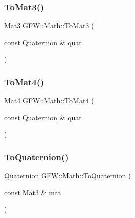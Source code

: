 \subsubsection{\texorpdfstring{To\+Mat3()}{ToMat3()}}
{\footnotesize\ttfamily \hyperlink{namespace_g_f_w_1_1_math_ab5dfc77d541d85c8e2a42f6e645fba70}{Mat3} G\+F\+W\+::\+Math\+::\+To\+Mat3 (\begin{DoxyParamCaption}\item[{const \hyperlink{namespace_g_f_w_1_1_math_ae0c2a9f7efcd94286b950a2ddea66ee0}{Quaternion} \&}]{quat }\end{DoxyParamCaption})\hspace{0.3cm}{\ttfamily [inline]}}

\mbox{\label{namespace_g_f_w_1_1_math_a96067ac21170d0dc012478d488f90b40}} 
\subsubsection{\texorpdfstring{To\+Mat4()}{ToMat4()}}
{\footnotesize\ttfamily \hyperlink{namespace_g_f_w_1_1_math_a313d630ab7d0ef3b109bb39401962fb1}{Mat4} G\+F\+W\+::\+Math\+::\+To\+Mat4 (\begin{DoxyParamCaption}\item[{const \hyperlink{namespace_g_f_w_1_1_math_ae0c2a9f7efcd94286b950a2ddea66ee0}{Quaternion} \&}]{quat }\end{DoxyParamCaption})\hspace{0.3cm}{\ttfamily [inline]}}

\mbox{\label{namespace_g_f_w_1_1_math_a687d2ab6e9ec6a46e494f038adadafac}} 
\subsubsection{\texorpdfstring{To\+Quaternion()}{ToQuaternion()}\hspace{0.1cm}{\footnotesize\ttfamily [1/2]}}
{\footnotesize\ttfamily \hyperlink{namespace_g_f_w_1_1_math_ae0c2a9f7efcd94286b950a2ddea66ee0}{Quaternion} G\+F\+W\+::\+Math\+::\+To\+Quaternion (\begin{DoxyParamCaption}\item[{const \hyperlink{namespace_g_f_w_1_1_math_ab5dfc77d541d85c8e2a42f6e645fba70}{Mat3} \&}]{mat }\end{DoxyParamCaption})\hspace{0.3cm}{\ttfamily [inline]}}

